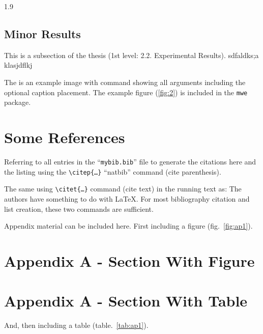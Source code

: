 \documentclass[ms-thesis,12pt,mathdesign]{ndsu-thesis-2022}
\newcommand{\makebib}{\biblio{apalike}{mybib}} %
\newcommand\myspacing{1.9} %
\begin{document}
\begin{spacing}{\myspacing}
\subsection{Minor Results}
This is a subsection of the thesis (1st level: 2.2. Experimental Results). 	sdfaldks;a  klasjdflkj 

\kant[8]
The  is an example image with command showing all arguments including the optional 
caption placement. The example figure (\cref{fig:2}) is included in the \texttt{mwe} package.

\kant[8]

\section{Some References}
Referring to all entries in the ``\texttt{mybib.bib}'' file to generate the citations here
and the listing using the \texttt{\textbackslash citep\{\ldots\}} ``natbib'' command
(cite parenthesis)\citep{texbook,lcompanion,latex2e,knuth1984,lesk1977,amsthm2017,
calvo2004using,cannayen2011latex,kopka2004guide,notso2021,bari2016identification}.

The same using \texttt{\textbackslash citet\{\ldots\}} command (cite text) in the running
text as: The authors \citet{texbook,lcompanion,latex2e,knuth1984,lesk1977,amsthm2017,
calvo2004using,cannayen2011latex,kopka2004guide,notso2021,bari2016identification} have something to do with \LaTeX. For most bibliography citation and 
list creation, these two commands are sufficient.

\makebib  %

Appendix material can be included here. First including a figure (fig.~\ref{fig:ap1}).

\section{Appendix A - Section With Figure}
	\kant[8]

\section{Appendix A - Section With Table}
And, then including a table (table.~\ref{tab:ap1}).


\end{spacing}
\end{document}
